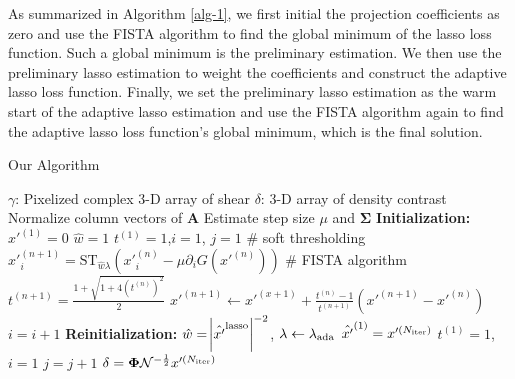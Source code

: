 As summarized in Algorithm \ref{alg-1}, we first initial the projection
coefficients as zero and use the FISTA algorithm to find the global minimum of
the lasso loss function. Such a global minimum is the preliminary estimation.
We then use the preliminary lasso estimation to weight the coefficients and
construct the adaptive lasso loss function. Finally, we set the preliminary
lasso estimation as the warm start of the adaptive lasso estimation and use the
FISTA algorithm again to find the adaptive lasso loss function's global minimum,
which is the final solution.


\begin{algorithm}[H]
\renewcommand{\thealgorithm}{}
\label{alg-1}
\caption{Our Algorithm}
\begin{algorithmic}[1]
\INPUT $\gamma$: Pixelized complex $3$-D array of shear
\OUTPUT  $\delta$: $3$-D array of density contrast
\STATE Normalize column vectors of $\mathbf{A}$
\STATE Estimate step size $\mu$ and $\mathbf{\Sigma}$
\STATE \textbf{Initialization:}
\STATE $x'^{(1)} = 0$
\STATE $\hat{w}=1$
\STATE $t^{(1)}=1$,$i=1$, $j=1$
        \STATE \# soft thresholding
        \STATE $x'^{(n+1)}_{i}=\mathrm{ST}_{\hat{w}\lambda} \left(x'^{(n)}_{i} -\mu \partial_i G(x'^{(n)})\right)$
        \STATE \# FISTA algorithm
        \STATE $t^{(n+1)}=\frac{1+\sqrt{1+4(t^{(n)})^2}}{2}$
        \STATE $x'^{(n+1)} \leftarrow x'^{(x+1)}+ \frac{t^{(n)}-1}{t^{(n+1)}}(x'^{(n+1)}-x'^{(n)})$
        \STATE $i=i+1$
    \ENDWHILE
\STATE \textbf{Reinitialization:}
\STATE $\hat{w}=\abs{\hat{x'}^{\rm{lasso}}}^{-2}$, $\lambda \leftarrow
\lambda_{\rm{ada}}$
\STATE $\hat{x'}^{(1)} = x'^{(N_{\rm{iter}})}$
\STATE $t^{(1)}=1$, $i=1$
\STATE $j=j+1$
\ENDWHILE
\STATE $\delta=\mathbf{\Phi}\mathcal{N}^{-\frac{1}{2}}x'^{(N_{\rm{iter}})}$
\end{algorithmic}
\end{algorithm}
